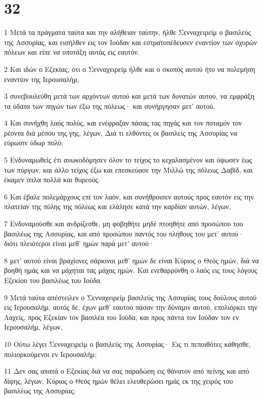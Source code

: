 \chapter{32}

\par 1 Μετά τα πράγματα ταύτα και την αλήθειαν ταύτην, ήλθε Σενναχειρείμ ο βασιλεύς της Ασσυρίας, και εισήλθεν εις τον Ιούδαν και εστρατοπέδευσεν εναντίον των οχυρών πόλεων και είπε να υποτάξη αυτάς εις εαυτόν.
\par 2 Και ιδών ο Εζεκίας, ότι ο Σενναχειρείμ ήλθε και ο σκοπός αυτού ήτο να πολεμήση εναντίον της Ιερουσαλήμ,
\par 3 συνεβουλεύθη μετά των αρχόντων αυτού και μετά των δυνατών αυτού, να εμφράξη τα ύδατα των πηγών των έξω της πόλεως· και συνήργησαν μετ' αυτού.
\par 4 Και συνήχθη λαός πολύς, και ενέφραξαν πάσας τας πηγάς και τον ποταμόν τον ρέοντα διά μέσου της γης, λέγων, Διά τι ελθόντες οι βασιλείς της Ασσυρίας να εύρωσιν ύδωρ πολύ;
\par 5 Ενδυναμωθείς έτι ανωκοδόμησεν όλον το τείχος το κεχαλασμένον και ύψωσεν έως των πύργων, και άλλο τείχος έξω και επεσκεύασε την Μιλλώ της πόλεως Δαβίδ, και έκαμεν όπλα πολλά και θυρεούς.
\par 6 Και έβαλε πολεμάρχους επί τον λαόν, και συνήθροισεν αυτούς προς εαυτόν εις την πλατείαν της πύλης της πόλεως και ελάλησε κατά την καρδίαν αυτών, λέγων,
\par 7 Ενδυναμούσθε και ανδρίζεσθε, μη φοβηθήτε μηδέ πτοηθήτε από προσώπου του βασιλέως της Ασσυρίας, και από προσώπου παντός του πλήθους του μετ' αυτού· διότι πλειότεροι είναι μεθ' ημών παρά μετ' αυτού·
\par 8 μετ' αυτού είναι βραχίονες σάρκινοι μεθ' ημών δε είναι Κύριος ο Θεός ημών, διά να βοηθή ημάς και να μάχηται τας μάχας ημών. Και ενεθαρρύνθη ο λαός εις τους λόγους Εζεκίου του βασιλέως του Ιούδα.
\par 9 Μετά ταύτα απέστειλεν ο Σενναχειρείμ βασιλεύς της Ασσυρίας τους δούλους αυτού εις Ιερουσαλήμ, αυτός δε, έχων μεθ' εαυτού πάσαν την δύναμιν αυτού, επολιόρκει την Λαχείς, προς Εζεκίαν τον βασιλέα του Ιούδα, και προς πάντα τον Ιούδαν τον εν Ιερουσαλήμ, λέγων,
\par 10 Ούτω λέγει Σενναχειρείμ ο βασιλεύς της Ασσυρίας· Εις τι πεποιθότες κάθησθε, πολιορκούμενοι εν Ιερουσαλήμ;
\par 11 Δεν σας απατά ο Εζεκίας διά να σας παραδώση εις θάνατον από πείνης και από δίψης, λέγων, Κύριος ο Θεός ημών θέλει ελευθερώσει ημάς εκ της χειρός του βασιλέως της Ασσυρίας;
